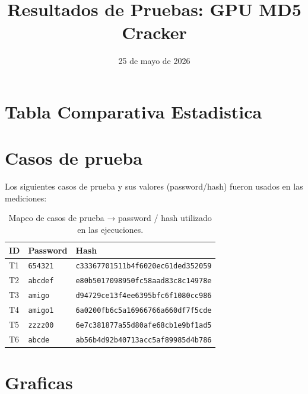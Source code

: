 \documentclass[11pt,a4paper]{article}
\title{Resultados de Pruebas: GPU MD5 Cracker}
\date{25 de mayo de 2026}
\begin{document}
\maketitle

\section*{Tabla Comparativa Estadistica}


\section*{Casos de prueba}
Los siguientes casos de prueba y sus valores (password/hash) fueron usados en las mediciones:
\begin{table}[h]
\centering
\small
\begin{tabular}{l l l}
\toprule
ID & Password & Hash \\
\midrule
T1 & \texttt{654321} & \texttt{c33367701511b4f6020ec61ded352059} \\
T2 & \texttt{abcdef} & \texttt{e80b5017098950fc58aad83c8c14978e} \\
T3 & \texttt{amigo} & \texttt{d94729ce13f4ee6395bfc6f1080cc986} \\
T4 & \texttt{amigo1} & \texttt{6a0200fb6c5a16966766a660df7f5cde} \\
T5 & \texttt{zzzz00} & \texttt{6e7c381877a55d80afe68cb1e9bf1ad5} \\
T6 & \texttt{abcde} & \texttt{ab56b4d92b40713acc5af89985d4b786} \\
\bottomrule
\end{tabular}
\caption{Mapeo de casos de prueba → password / hash utilizado en las ejecuciones.}
\end{table}

\section*{Graficas}

\end{document}
